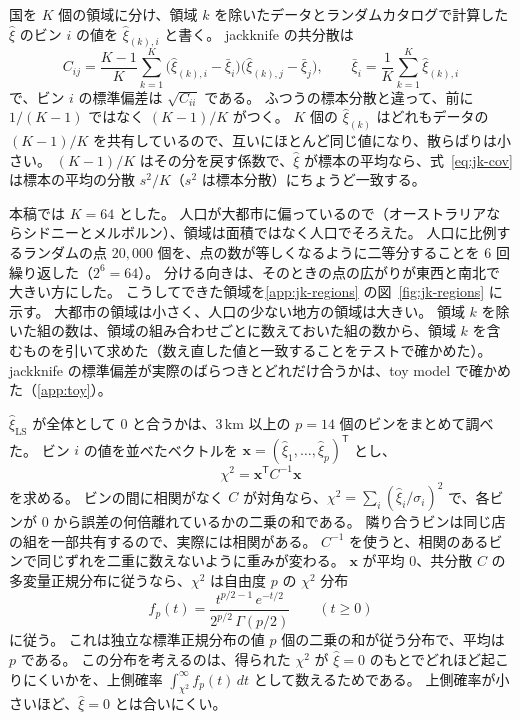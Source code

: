\documentclass[a4paper,11pt]{ltjsarticle}
\begin{document}
国を $K$ 個の領域に分け、領域 $k$ を除いたデータとランダムカタログで計算した $\hat\xi$ のビン $i$ の値を $\hat\xi_{(k),i}$ と書く。
jackknife の共分散は
\begin{equation}
  C_{ij} = \frac{K-1}{K} \sum_{k=1}^{K} \bigl(\hat\xi_{(k),i} - \bar\xi_i\bigr)\bigl(\hat\xi_{(k),j} - \bar\xi_j\bigr),
  \qquad
  \bar\xi_i = \frac{1}{K} \sum_{k=1}^{K} \hat\xi_{(k),i}
  \label{eq:jk-cov}
\end{equation}
で、ビン $i$ の標準偏差は $\sqrt{C_{ii}}$ である。
ふつうの標本分散と違って、前に $1/(K-1)$ ではなく $(K-1)/K$ がつく。
$K$ 個の $\hat\xi_{(k)}$ はどれもデータの $(K-1)/K$ を共有しているので、互いにほとんど同じ値になり、散らばりは小さい。
$(K-1)/K$ はその分を戻す係数で、$\hat\xi$ が標本の平均なら、式~\eqref{eq:jk-cov} は標本の平均の分散 $s^2/K$（$s^2$ は標本分散）にちょうど一致する。

本稿では $K = 64$ とした。
人口が大都市に偏っているので（オーストラリアならシドニーとメルボルン）、領域は面積ではなく人口でそろえた。
人口に比例するランダムの点 $20{,}000$ 個を、点の数が等しくなるように二等分することを 6 回繰り返した（$2^6 = 64$）。
分ける向きは、そのときの点の広がりが東西と南北で大きい方にした。
こうしてできた領域を\ref{app:jk-regions} の図~\ref{fig:jk-regions} に示す。
大都市の領域は小さく、人口の少ない地方の領域は大きい。
領域 $k$ を除いた組の数は、領域の組み合わせごとに数えておいた組の数から、領域 $k$ を含むものを引いて求めた（数え直した値と一致することをテストで確かめた）。
jackknife の標準偏差が実際のばらつきとどれだけ合うかは、toy model で確かめた（\ref{app:toy}）。

$\hat\xi_{\mathrm{LS}}$ が全体として $0$ と合うかは、$3\,\mathrm{km}$ 以上の $p = 14$ 個のビンをまとめて調べた。
ビン $i$ の値を並べたベクトルを $\bm{x} = (\hat\xi_1, \dots, \hat\xi_p)^{\mathsf T}$ とし、
\begin{equation}
  \chi^2 = \bm{x}^{\mathsf T} C^{-1} \bm{x}
  \label{eq:chi2}
\end{equation}
を求める。
ビンの間に相関がなく $C$ が対角なら、$\chi^2 = \sum_i (\hat\xi_i/\sigma_i)^2$ で、各ビンが $0$ から誤差の何倍離れているかの二乗の和である。
隣り合うビンは同じ店の組を一部共有するので、実際には相関がある。
$C^{-1}$ を使うと、相関のあるビンで同じずれを二重に数えないように重みが変わる。
$\bm{x}$ が平均 $0$、共分散 $C$ の多変量正規分布に従うなら、$\chi^2$ は自由度 $p$ の $\chi^2$ 分布
\begin{equation}
  f_p(t) = \frac{t^{p/2-1}\, e^{-t/2}}{2^{p/2}\, \Gamma(p/2)} \qquad (t \ge 0)
  \label{eq:chi2-pdf}
\end{equation}
に従う。
これは独立な標準正規分布の値 $p$ 個の二乗の和が従う分布で、平均は $p$ である。
この分布を考えるのは、得られた $\chi^2$ が $\hat\xi = 0$ のもとでどれほど起こりにくいかを、上側確率 $\int_{\chi^2}^{\infty} f_p(t)\, dt$ として数えるためである。
上側確率が小さいほど、$\hat\xi = 0$ とは合いにくい。
\end{document}
